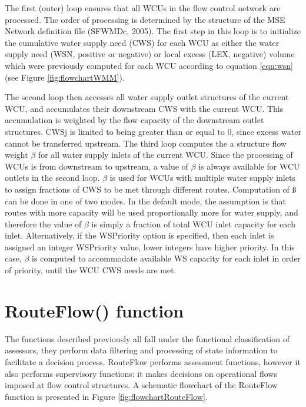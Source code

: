 The first (outer) loop ensures that all WCUs in the flow control
network are processed. The order of processing is determined by the
structure of the MSE Network definition file (SFWMDc,
2005)\nocite{sfwmdc:2005}. The first step in this loop is to
initialize the cumulative water supply need (CWS) for each WCU as
either the water supply need (WSN, positive or negative) or local
excess (LEX, negative) volume which were previously computed for each
WCU according to equation \ref{eqn:wsn} (see Figure
\ref{fig:flowchartWMM}).

The second loop then accesses all water supply outlet structures of
the current WCU, and accumulates their downstream CWS with the current
WCU. This accumulation is weighted by the flow capacity of the
downstream outlet structures. CWSj is limited to being greater than or
equal to 0, since excess water cannot be transferred upstream. The
third loop computes the a structure flow weight $\beta$ for all water
supply inlets of the current WCU. Since the processing of WCUs is from
downstream to upstream, a value of $\beta$ is always available for WCU
outlets in the second loop. $\beta$ is used for WCUs with multiple
water supply inlets to assign fractions of CWS to be met through
different routes. Computation of ß can be done in one of two modes. In
the default mode, the assumption is that routes with more capacity
will be used proportionally more for water supply, and therefore the
value of $\beta$ is simply a fraction of total WCU inlet capacity for
each inlet. Alternatively, if the WSPriority option is specified, then
each inlet is assigned an integer WSPriority value, lower integers
have higher priority. In this case, $\beta$ is computed to accommodate
available WS capacity for each inlet in order of priority, until the
WCU CWS needs are met.

\section {RouteFlow() function}

The functions described previously all fall under the functional
classification of assessors, they perform data filtering and
processing of state information to facilitate a decision
process. RouteFlow performs assessment functions, however it also
performs supervisory functions: it makes decisions on operational
flows imposed at flow control structures. A schematic flowchart of the
RouteFlow function is presented in Figure \ref{fig:flowchartRouteFlow}.

